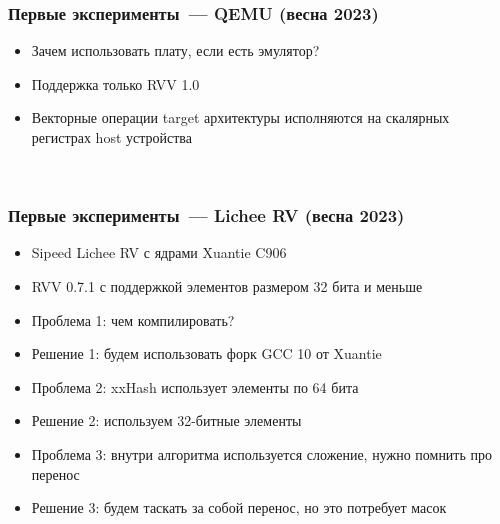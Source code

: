 \documentclass[aspectratio=169, handout]{beamer}
\begin{document}
\begin{frame}
    \frametitle{Первые эксперименты~--- QEMU (весна 2023)}

    \begin{itemize}[<+->]
        \item Зачем использовать плату, если есть эмулятор?
        \item Поддержка только RVV 1.0
        \item Векторные операции target архитектуры исполняются на скалярных регистрах host устройства
    \end{itemize}

    \ %


\end{frame}

\begin{frame}
    \frametitle{Первые эксперименты~--- Lichee RV (весна 2023)}

    \begin{itemize}[<+->]
        \item Sipeed Lichee RV с ядрами Xuantie C906
        \item RVV 0.7.1 с поддержкой элементов размером 32 бита и меньше
        \item \textcolor{solarizedRed}{Проблема 1:} чем компилировать?
        \item \textcolor{solarizedGreen}{Решение 1:} будем использовать форк GCC 10 от Xuantie
        \item \textcolor{solarizedRed}{Проблема 2:} xxHash использует элементы по 64 бита
        \item \textcolor{solarizedGreen}{Решение 2:} используем 32-битные элементы
        \item \textcolor{solarizedRed}{Проблема 3:} внутри алгоритма используется сложение, нужно помнить про перенос
        \item \textcolor{solarizedGreen}{Решение 3:} будем таскать за собой перенос, но это потребует масок
    \end{itemize}

    \ %


\end{frame}
\end{document}
